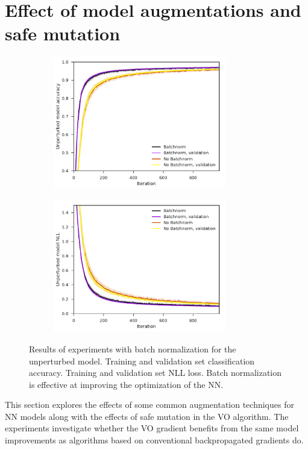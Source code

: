 
\section{Effect of model augmentations and safe mutation}\label{sec: Experimental work: Effects of common model and algorithm augmentations}

\begin{figure}[tbp!]
    \begin{subfigure}[b]{0.49\textwidth}
        \centering
        \includegraphics[height=5.8cm]{graphics/E020-bn-analysis/accuracy_unp-all-series-mean-sd.pdf}
        \caption{}
        \label{fig: Theory: E020-bn-analysis/accuracy_unp-all-series-mean-sd}
    \end{subfigure}
    \hfill
    \begin{subfigure}[b]{0.49\textwidth}
        \centering
        \includegraphics[height=5.8cm]{graphics/E020-bn-analysis/return_unp-all-series-mean-sd.pdf}
        \caption{}
        \label{fig: Theory: E020-bn-analysis/return_unp-all-series-mean-sd}
    \end{subfigure}
    \caption{
        Results of experiments with batch normalization for the unperturbed model.
         Training and validation set classification accuracy.
         Training and validation set \gls{NLL} loss.
        Batch normalization is effective at improving the optimization of the \gls{NN}.
    }
    \label{fig: Theory: E020-bn-analysis}
\end{figure}
This section explores the effects of some common augmentation techniques for \gls{NN} models along with the effects of safe mutation in the \gls{VO} algorithm. The experiments investigate whether the \gls{VO} gradient benefits from the same model improvements as algorithms based on conventional backpropagated gradients do.


